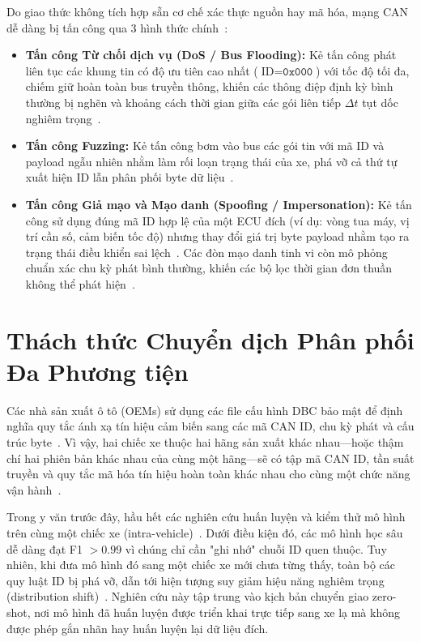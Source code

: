 \documentclass[12pt, a4paper, reqno, oneside]{book}
\begin{document}
Do giao thức không tích hợp sẵn cơ chế xác thực nguồn hay mã hóa, mạng CAN dễ dàng bị tấn công qua 3 hình thức chính~\cite{song2020invehicle,lee2017otids,dupont2019automotive}:
\begin{itemize}
    \item \textbf{Tấn công Từ chối dịch vụ (DoS / Bus Flooding):} Kẻ tấn công phát liên tục các khung tin có độ ưu tiên cao nhất ($\text{ID} = \texttt{0x000}$) với tốc độ tối đa, chiếm giữ hoàn toàn bus truyền thông, khiến các thông điệp định kỳ bình thường bị nghẽn và khoảng cách thời gian giữa các gói liên tiếp $\Delta t$ tụt dốc nghiêm trọng~\cite{song2020invehicle,neto2024ciciov2024}.
    \item \textbf{Tấn công Fuzzing:} Kẻ tấn công bơm vào bus các gói tin với mã ID và payload ngẫu nhiên nhằm làm rối loạn trạng thái của xe, phá vỡ cả thứ tự xuất hiện ID lẫn phân phối byte dữ liệu~\cite{lee2017otids,dupont2019automotive}.
    \item \textbf{Tấn công Giả mạo và Mạo danh (Spoofing / Impersonation):} Kẻ tấn công sử dụng đúng mã ID hợp lệ của một ECU đích (ví dụ: vòng tua máy, vị trí cần số, cảm biến tốc độ) nhưng thay đổi giá trị byte payload nhằm tạo ra trạng thái điều khiển sai lệch~\cite{song2020invehicle,rajapaksha2024canmirgu,neto2024ciciov2024}. Các đòn mạo danh tinh vi còn mô phỏng chuẩn xác chu kỳ phát bình thường, khiến các bộ lọc thời gian đơn thuần không thể phát hiện~\cite{dupont2019automotive}.
\end{itemize}

\section{Thách thức Chuyển dịch Phân phối Đa Phương tiện}
\label{subsec:cross_vehicle_ids}

Các nhà sản xuất ô tô (OEMs) sử dụng các file cấu hình DBC bảo mật để định nghĩa quy tắc ánh xạ tín hiệu cảm biến sang các mã CAN ID, chu kỳ phát và cấu trúc byte~\cite{lampe2023cantrain,lampe2024curated}. Vì vậy, hai chiếc xe thuộc hai hãng sản xuất khác nhau---hoặc thậm chí hai phiên bản khác nhau của cùng một hãng---sẽ có tập mã CAN ID, tần suất truyền và quy tắc mã hóa tín hiệu hoàn toàn khác nhau cho cùng một chức năng vận hành~\cite{lampe2024curated}.

Trong y văn trước đây, hầu hết các nghiên cứu huấn luyện và kiểm thử mô hình trên cùng một chiếc xe (intra-vehicle)~\cite{song2020invehicle,lee2017otids}. Dưới điều kiện đó, các mô hình học sâu dễ dàng đạt F1 $>0.99$ vì chúng chỉ cần "ghi nhớ" chuỗi ID quen thuộc. Tuy nhiên, khi đưa mô hình đó sang một chiếc xe mới chưa từng thấy, toàn bộ các quy luật ID bị phá vỡ, dẫn tới hiện tượng suy giảm hiệu năng nghiêm trọng (distribution shift)~\cite{lampe2023cantrain,lampe2024curated,koltai2026canwetrust}. Nghiên cứu này tập trung vào kịch bản chuyển giao zero-shot, nơi mô hình đã huấn luyện được triển khai trực tiếp sang xe lạ mà không được phép gắn nhãn hay huấn luyện lại dữ liệu đích.
\end{document}
